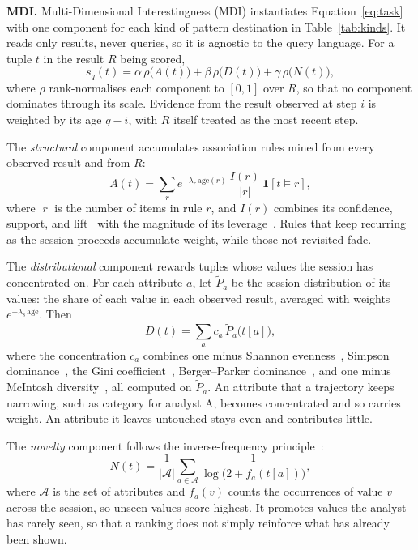 \documentclass[sigconf]{acmart}
\begin{document}
\textbf{MDI.}
Multi-Dimensional Interestingness (MDI) instantiates Equation~\ref{eq:task} with one component for each kind of pattern destination in Table~\ref{tab:kinds}. It reads only results, never queries, so it is agnostic to the query language. For a tuple $t$ in the result $R$ being scored,
\begin{equation}
  s_q(t)=\alpha\,\rho\big(A(t)\big)+\beta\,\rho\big(D(t)\big)+\gamma\,\rho\big(N(t)\big),
  \label{eq:mdi}
\end{equation}
where $\rho$ rank-normalises each component to $[0,1]$ over $R$, so that no component dominates through its scale. Evidence from the result observed at step $i$ is weighted by its age $q-i$, with $R$ itself treated as the most recent step.

The \emph{structural} component accumulates association rules mined from every observed result and from $R$:
\begin{equation}
  A(t)=\sum_{r} e^{-\lambda_r\,\mathrm{age}(r)}\,\frac{I(r)}{|r|}\,\mathbf{1}[t\models r],
  \label{eq:assoc}
\end{equation}
where $|r|$ is the number of items in rule $r$, and $I(r)$ combines its confidence, support, and lift~\cite{geng2006interestingness} with the magnitude of its leverage~\cite{piatetsky-shapiroDiscoveryAnalysisPresentation1991}. Rules that keep recurring as the session proceeds accumulate weight, while those not revisited fade.

The \emph{distributional} component rewards tuples whose values the session has concentrated on. For each attribute $a$, let $\tilde P_a$ be the session distribution of its values: the share of each value in each observed result, averaged with weights $e^{-\lambda_s\,\mathrm{age}}$. Then
\begin{equation}
  D(t)=\sum_{a} c_a\,\tilde P_a\big(t[a]\big),
  \label{eq:dist}
\end{equation}
where the concentration $c_a$ combines one minus Shannon evenness~\cite{shannon1948mathematical}, Simpson dominance~\cite{edwardsimpsonMeasurementDiversity1949}, the Gini coefficient~\cite{gini1921measurement}, Berger--Parker dominance~\cite{bergerDiversityPlanktonicForaminifera1970}, and one minus McIntosh diversity~\cite{mcintoshIndexDiversityRelation1967}, all computed on $\tilde P_a$. An attribute that a trajectory keeps narrowing, such as category for analyst A, becomes concentrated and so carries weight. An attribute it leaves untouched stays even and contributes little.

The \emph{novelty} component follows the inverse-frequency principle~\cite{sparckjones1972statistical}:
\begin{equation}
  N(t)=\frac{1}{|\mathcal{A}|}\sum_{a\in\mathcal{A}}\frac{1}{\log\big(2+f_a(t[a])\big)},
  \label{eq:novelty}
\end{equation}
where $\mathcal{A}$ is the set of attributes and $f_a(v)$ counts the occurrences of value $v$ across the session, so unseen values score highest. It promotes values the analyst has rarely seen, so that a ranking does not simply reinforce what has already been shown.
\end{document}
